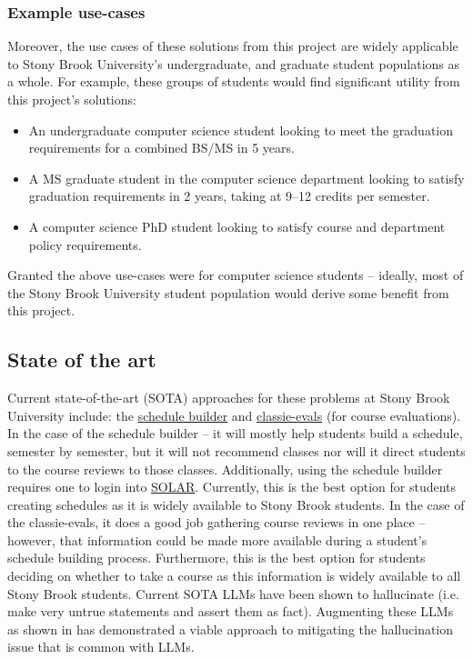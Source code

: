 \documentclass[12pt]{article}
\begin{document}
    \subsubsection{Example use-cases}
    \label{subsubsec:example}
    Moreover, the use cases of these solutions from this project are widely applicable to Stony Brook University's undergraduate, and graduate student populations as a whole. For example, these groups of students would find significant utility from this project's solutions:
    \begin{itemize}
        \item An undergraduate computer science student looking to meet the graduation requirements for a combined BS/MS in 5 years.
        \item A MS graduate student in the computer science department looking to satisfy graduation requirements in 2 years, taking at  9--12 credits per semester.
        \item A computer science PhD student looking to satisfy course and department policy requirements.
    \end{itemize}

    Granted the above use-cases were for computer science students -- ideally, most of the Stony Brook University student population would derive some benefit from this project.

    \subsection{State of the art}
    \label{subsec:sota}
    Current state-of-the-art (SOTA) approaches for these problems at Stony Brook University include: the \href{https://you.stonybrook.edu/uaamedia/schedulebuilder/}{schedule builder} and \href{https://classie-evals.stonybrook.edu/}{classie-evals} (for course evaluations). In the case of the schedule builder -- it will mostly help students build a schedule, semester by semester\cite{sched}, but it will not recommend classes nor will it direct students to the course reviews to those classes. Additionally, using the schedule builder requires one to login into \href{https://it.stonybrook.edu/services/solar}{SOLAR}\cite{sched}. Currently, this is the best option for students creating schedules as it is widely available to Stony Brook students.
    In the case of the classie-evals, it does a good job gathering course reviews in one place\cite{class} -- however, that information could be made more available during a student's schedule building process. Furthermore, this is the best option for students deciding on whether to take a course as this information is widely available to all Stony Brook students.
    Current SOTA LLMs \cite{alpaca,touvron2023llama,touvron2023llama2,ye2023gpt3.5} have been shown to hallucinate (i.e. make very untrue statements and assert them as fact). Augmenting these LLMs as shown in \cite{luo2024} has demonstrated a viable approach to mitigating the hallucination issue that is common with LLMs. 
\end{document}
